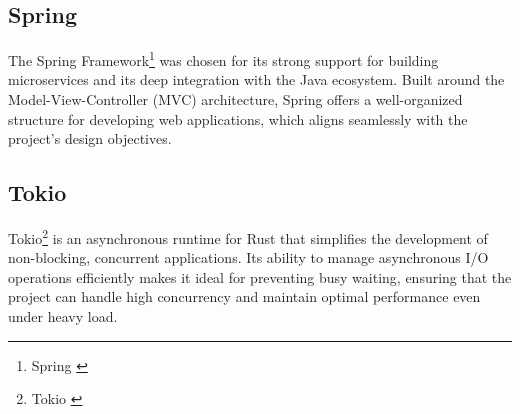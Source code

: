 \subsection{Spring}
The Spring Framework\footnote{Spring \cite{spring}} was chosen for its
strong support for building microservices
and its deep integration with the Java ecosystem.
Built around the Model-View-Controller (MVC) architecture,
Spring offers a well-organized structure
for developing web applications, which aligns seamlessly with
the project’s design objectives.

\subsection{Tokio}
Tokio\footnote{Tokio \cite{tokio}} is an asynchronous runtime for Rust
that simplifies the development of non-blocking, concurrent applications.
Its ability to manage asynchronous I/O operations efficiently makes it
ideal for preventing busy waiting,
ensuring that the project can handle high concurrency and maintain
optimal performance even under heavy load.
